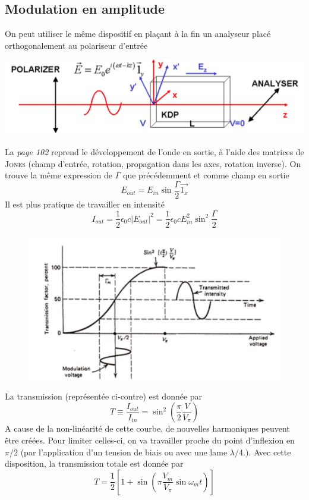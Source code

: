 \subsection{Modulation en amplitude}
On peut utiliser le même dispositif en plaçant à la fin un analyseur placé orthogonalement au polariseur
d'entrée
\begin{center}
	\includegraphics[scale=0.5]{ch6/image4}
\end{center}
La \textit{page 102} reprend le développement de l'onde en sortie, à l'aide des matrices de 
\textsc{Jones} (champ d'entrée, rotation, propagation dans les axes, rotation inverse). On trouve la
même expression de $\Gamma$ que précédemment et comme champ en sortie
\begin{equation}
E_{out} = E_{in}\sin\dfrac{\Gamma}{2}\vec{1_x}
\end{equation}
Il est plus pratique de travailler en intensité
\begin{equation}
I_{out} = \frac{1}{2}\epsilon_0c|E_{out}|^2 = \frac{1}{2}\epsilon_0c E_{in}^2\sin^2\frac{\Gamma}{2}
\end{equation}

	\begin{figure}
	\vspace{-5mm}
	\includegraphics[scale=0.4]{ch6/image5}
	\end{figure}
La transmission (représentée ci-contre) est donnée par
\begin{equation}
T \equiv \dfrac{I_{out}}{I_{in}} = \sin^2\left(\dfrac{\pi}{2}\dfrac{V}{V_\pi}\right)
\end{equation}
A cause de la non-linéarité de cette courbe, de nouvelles harmoniques peuvent être créées. Pour 
limiter celles-ci, on va travailler proche du point d’inflexion en $\pi/2$ (par l'application 
d'un tension de biais ou avec une lame $\lambda/4$.). Avec cette disposition, la transmission totale
est donnée par
\begin{equation}
T = \dfrac{1}{2}\left[1+\sin\left(\pi\dfrac{V_m}{V_\pi}\sin\omega_mt\right)\right]
\label{eq:6.38}
\end{equation}

